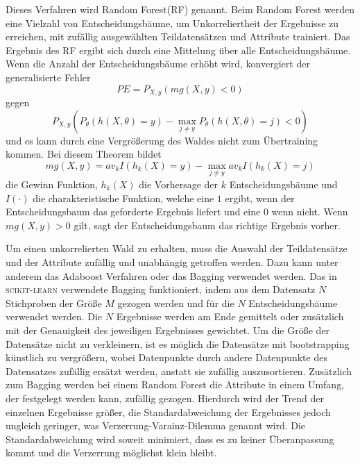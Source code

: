 Dieses Verfahren wird Random Forest(RF) genannt. Beim Random Forest werden eine Vielzahl von Entscheidungsbäume, um Unkorreliertheit der Ergebnisse zu erreichen, mit
zufällig ausgewählten Teildatensätzen und Attribute trainiert. Das Ergebnis des RF ergibt sich durch eine Mittelung über alle Entscheidungsbäume.
Wenn die Anzahl der Entscheidungsbäume erhöht wird, konvergiert der generalisierte Fehler
\begin{equation}
  PE = P_{X,y}(mg(X,y)<0)
\end{equation}
gegen
\begin{equation}
  P_{X,y}(P_\theta(h(X,\theta)=y)-\max_{j\neq y}P_\theta(h(X,\theta)=j)<0)
\end{equation}
und es kann durch eine Vergrößerung des Waldes nicht zum Übertraining kommen\cite[7]{RandomForests_Breiman}. Bei diesem Theorem bildet
\begin{equation}
  mg(X,y) = av_k I(h_k(X)=y) - \max_{j \neq y}av_k I(h_k(X)=j)
\end{equation}
die Gewinn Funktion, $h_k(X)$ die Vorhersage der $k$ Entscheidungsbäume und $I(\cdot)$ die charakteristische Funktion, welche eine $1$ ergibt, wenn der
Entscheidungsbaum das geforderte Ergebnis liefert und eine $0$ wenn nicht.
Wenn $mg(X,y) > 0$ gilt, sagt der Entscheidungsbaum das richtige Ergebnis vorher.

Um einen unkorrelierten Wald zu erhalten, muss die Auswahl der Teildatensätze und der Attribute zufällig und unabhängig getroffen werden.
Dazu kann unter anderem das Adaboost Verfahren oder das Bagging verwendet werden.
Das in \textsc{scikit-learn} verwendete Bagging funktioniert, indem aus dem Datensatz $N$ Stichproben der Größe $M$ gezogen werden und für die $N$ Entscheidungsbäume verwendet werden.
Die $N$ Ergebnisse werden am Ende gemittelt oder zusätzlich mit der Genauigkeit des jeweiligen Ergebnisses gewichtet.
Um die Größe der Datensätze nicht zu verkleinern, ist es möglich die Datensätze mit bootstrapping künstlich zu vergrößern, wobei Datenpunkte durch andere Datenpunkte
des Datensatzes zufällig ersätzt werden, anstatt sie zufällig auszusortieren.
Zusätzlich zum Bagging werden bei einem Random Forest die Attribute in einem Umfang, der festgelegt werden kann, zufällig gezogen.
Hierdurch wird der Trend der einzelnen Ergebnisse größer, die Standardabweichung der Ergebnisses jedoch ungleich geringer,
was Verzerrung-Varainz-Dilemma genannt wird. Die Standardabweichung wird soweit minimiert, dass es zu keiner Überanpassung kommt
und die Verzerrung möglichst klein bleibt.

